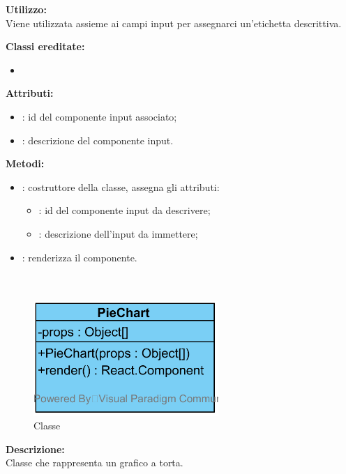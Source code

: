 \textbf{Utilizzo:}\\
Viene utilizzata assieme ai campi input per assegnarci un'etichetta descrittiva.

\textbf{Classi ereditate:}
\begin{itemize}
	\item {}
\end{itemize}


\textbf{Attributi:}
\begin{itemize}
	\item {}: id del componente input associato;
	\item {}: descrizione del componente input.
\end{itemize}

\textbf{Metodi:}
\begin{itemize}
	\item {}: costruttore della classe, assegna gli attributi:
	\begin{itemize}
		\item {}: id del componente input da descrivere;
		\item {}: descrizione dell'input da immettere;
	\end{itemize}
	\item {}: renderizza il componente.
\end{itemize}

\paragraph[::PieChart]{\class}\mbox{}\\ \label{\class}
\begin{figure}[H]
	\centering
	\includegraphics[width=7cm]{./diagrammi/framework/view/gui/piechart.png}
	\caption{Classe \class}
\end{figure}
\textbf{Descrizione:}\\
Classe che rappresenta un grafico a torta.


